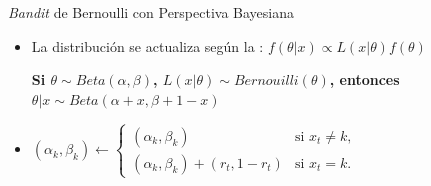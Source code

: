 \documentclass[10pt, envcountsect, handout, aspectratio=1610, hyperref={hypertexnames=true}]{beamer}
\begin{document}
\begin{frame}{\textit{Bandit} de Bernoulli con Perspectiva Bayesiana}
\begin{itemize}
    \item La distribución se actualiza según la : $f(\theta|x) \propto L(x|\theta) f(\theta)$
    
     \hfil \textbf{\small Si $\theta\sim Beta(\alpha, \beta)$, $L(x|\theta)\sim Bernouilli(\theta)$, entonces $\theta|x \sim Beta(\alpha + x, \beta + 1-x)$}
    
    
    \item {}
    
    \hfil\(
(\alpha_k, \beta_k) \leftarrow
\begin{cases} 
(\alpha_k, \beta_k) & \text{si } x_t \neq k, \\
(\alpha_k, \beta_k) + (r_t, 1 - r_t) & \text{si } x_t = k.
\end{cases}
\)

\end{itemize}
\end{frame}


\end{document}
